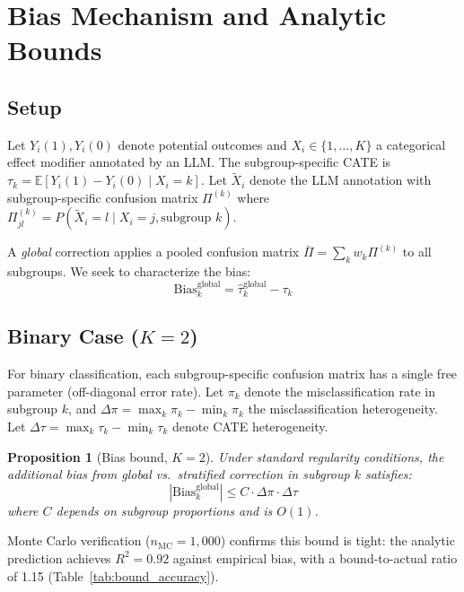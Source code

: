 \documentclass[11pt,a4paper]{article}
\newtheorem{proposition}{Proposition}
\begin{document}
\section{Bias Mechanism and Analytic Bounds}
\label{sec:theory}

\subsection{Setup}

Let $Y_i(1), Y_i(0)$ denote potential outcomes and $X_i \in \{1, \ldots, K\}$ a categorical effect modifier annotated by an LLM. The subgroup-specific CATE is $\tau_k = \mathbb{E}[Y_i(1) - Y_i(0) \mid X_i = k]$. Let $\tilde{X}_i$ denote the LLM annotation with subgroup-specific confusion matrix $\Pi^{(k)}$ where $\Pi^{(k)}_{jl} = P(\tilde{X}_i = l \mid X_i = j, \text{subgroup } k)$.

A \emph{global} correction applies a pooled confusion matrix $\bar{\Pi} = \sum_k w_k \Pi^{(k)}$ to all subgroups. We seek to characterize the bias:
\begin{equation}
\text{Bias}_k^{\text{global}} = \hat{\tau}_k^{\text{global}} - \tau_k
\end{equation}

\subsection{Binary Case ($K{=}2$)}

For binary classification, each subgroup-specific confusion matrix has a single free parameter (off-diagonal error rate). Let $\pi_k$ denote the misclassification rate in subgroup $k$, and $\Delta\pi = \max_k \pi_k - \min_k \pi_k$ the misclassification heterogeneity. Let $\Delta\tau = \max_k \tau_k - \min_k \tau_k$ denote CATE heterogeneity.

\begin{proposition}[Bias bound, $K{=}2$]
Under standard regularity conditions, the additional bias from global vs.\ stratified correction in subgroup $k$ satisfies:
\begin{equation}
|\text{Bias}_k^{\text{global}}| \leq C \cdot \Delta\pi \cdot \Delta\tau
\label{eq:bound}
\end{equation}
where $C$ depends on subgroup proportions and is $O(1)$.
\end{proposition}

Monte Carlo verification ($n_{\text{MC}} = 1{,}000$) confirms this bound is tight: the analytic prediction achieves $R^2 = 0.92$ against empirical bias, with a bound-to-actual ratio of 1.15 (Table~\ref{tab:bound_accuracy}).
\end{document}
